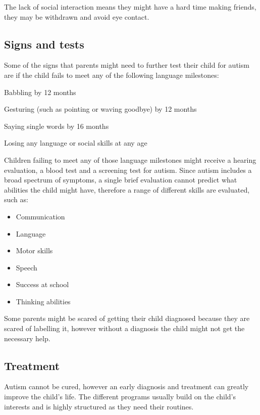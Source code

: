 The lack of social interaction means they might have a hard time making friends, they may be withdrawn and avoid eye contact.\citep{autism}

\subsection*{Signs and tests}

Some of the signs that parents might need to further test their child for autism are if the child fails to meet any of the following language milestones:

\begin{description}
\item Babbling by 12 months
\item Gesturing (such as pointing or waving goodbye) by 12 months
\item Saying single words by 16 months
\item Losing any language or social skills at any age
\end{description}

Children failing to meet any of those language milestones might receive a hearing evaluation, a blood test and a screening test for autism. Since autism includes a broad spectrum of symptoms, a single brief evaluation cannot predict what abilities the child might have, therefore a range of different skills are evaluated, such as:

\begin{itemize}
\item Communication
\item Language
\item Motor skills
\item Speech
\item Success at school
\item Thinking abilities
\end{itemize}

Some parents might be scared of getting their child diagnosed because they are scared of labelling it, however without a diagnosis the child might not get the necessary help.\citep{autism} 

\subsection*{Treatment}

Autism cannot be cured, however an early diagnosis and treatment can greatly improve the child's life. The different programs usually build on the child's interests and is highly structured as they need their routines.\citep{autism}